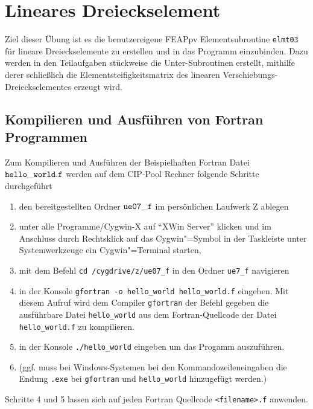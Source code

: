 \clearpage
\setcounter{page}{1}

\section{Lineares Dreieckselement}

Ziel dieser Übung ist es die benutzereigene FEAPpv Elementsubroutine \verb|elmt03| für lineare Dreieckselemente zu erstellen und in das Programm einzubinden.
Dazu werden in den Teilaufgaben stückweise die Unter-Subroutinen erstellt, mithilfe derer schließlich die Elementsteifigkeitsmatrix des linearen Verschiebungs-Dreieckselementes erzeugt wird.



\subsection*{Kompilieren und Ausführen von Fortran Programmen}

Zum Kompilieren und Ausführen der Beispielhaften Fortran Datei $\tt hello\_world.f $ werden auf dem CIP-Pool Rechner folgende Schritte durchgeführt

\begin{enumerate}[label=\arabic*.)]
 \item den bereitgestellten Ordner $\tt ue07\_f$ im persönlichen Laufwerk Z ablegen %
 \item unter alle Programme/Cygwin-X auf \enquote{XWin Server} klicken und im Anschluss durch Rechtsklick auf das Cygwin"=Symbol in der Taskleiste unter Systemwerkzeuge ein Cygwin"=Terminal starten,
 \item mit dem Befehl \verb|cd /cygdrive/z/ue07_f| in den Ordner \verb|ue7_f| navigieren
 \item in der Konsole \verb|gfortran -o hello_world hello_world.f| eingeben. 
 Mit diesem Aufruf wird dem Compiler \verb|gfortran| der Befehl gegeben die ausführbare Datei \verb|hello_world| aus dem Fortran-Quellcode der Datei \verb|hello_world.f| zu kompilieren.
 \item in der Konsole \verb|./hello_world| eingeben um das Progamm auszuführen.
 \item[]
 (ggf. muss bei Windows-Systemen bei den Kommandozeileneingaben die Endung \verb|.exe| bei \verb|gfortran| und \verb|hello_world| hinzugefügt werden.)
\end{enumerate}

Schritte 4 und 5 lassen sich auf jeden Fortran Quellcode \verb|<filename>.f| anwenden.\medskip


